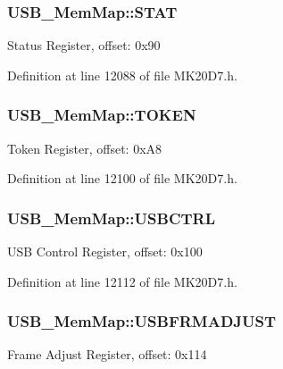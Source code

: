 \subsubsection[{\texorpdfstring{S\+T\+AT}{STAT}}]{ U\+S\+B\+\_\+\+Mem\+Map\+::\+S\+T\+AT}\hypertarget{struct_u_s_b___mem_map_acad1a20eb41fab37316b6b7b98c00053}{}\label{struct_u_s_b___mem_map_acad1a20eb41fab37316b6b7b98c00053}
Status Register, offset\+: 0x90 

Definition at line 12088 of file M\+K20\+D7.\+h.

\subsubsection[{\texorpdfstring{T\+O\+K\+EN}{TOKEN}}]{ U\+S\+B\+\_\+\+Mem\+Map\+::\+T\+O\+K\+EN}\hypertarget{struct_u_s_b___mem_map_a8806f493a96bf80f94a1b04fd5a595a7}{}\label{struct_u_s_b___mem_map_a8806f493a96bf80f94a1b04fd5a595a7}
Token Register, offset\+: 0x\+A8 

Definition at line 12100 of file M\+K20\+D7.\+h.

\subsubsection[{\texorpdfstring{U\+S\+B\+C\+T\+RL}{USBCTRL}}]{ U\+S\+B\+\_\+\+Mem\+Map\+::\+U\+S\+B\+C\+T\+RL}\hypertarget{struct_u_s_b___mem_map_a593a3dc10eb92a0dab6f62dbda5f0209}{}\label{struct_u_s_b___mem_map_a593a3dc10eb92a0dab6f62dbda5f0209}
U\+SB Control Register, offset\+: 0x100 

Definition at line 12112 of file M\+K20\+D7.\+h.

\subsubsection[{\texorpdfstring{U\+S\+B\+F\+R\+M\+A\+D\+J\+U\+ST}{USBFRMADJUST}}]{ U\+S\+B\+\_\+\+Mem\+Map\+::\+U\+S\+B\+F\+R\+M\+A\+D\+J\+U\+ST}\hypertarget{struct_u_s_b___mem_map_a1bb1b3975dfcbbe78635e2d08b16553d}{}\label{struct_u_s_b___mem_map_a1bb1b3975dfcbbe78635e2d08b16553d}
Frame Adjust Register, offset\+: 0x114 

